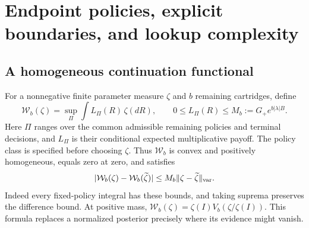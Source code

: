 \section{Endpoint policies, explicit boundaries, and lookup complexity}\label{sec:policy}
\subsection{A homogeneous continuation functional}
For a nonnegative finite parameter measure $\zeta$ and $b$ remaining
cartridges, define
\[
 \mathcal W_b(\zeta)=\sup_\Pi\int L_\Pi(R)\,\zeta(dR),
 \qquad 0\le L_\Pi(R)\le M_b:=G_+e^{b|\lambda|B}.
\]
Here $\Pi$ ranges over the common admissible remaining policies and terminal
decisions, and $L_\Pi$ is their conditional expected multiplicative payoff.
The policy class is specified before choosing $\zeta$. Thus $\mathcal W_b$
is convex and positively homogeneous, equals zero at zero, and satisfies
\begin{equation}
 |\mathcal W_b(\zeta)-\mathcal W_b(\widetilde\zeta)|
 \le M_b\|\zeta-\widetilde\zeta\|_{\rm var}. \label{eq:homogeneous-Lipschitz}
\end{equation}
Indeed every fixed-policy integral has these bounds, and taking suprema
preserves the difference bound. At positive mass,
$\mathcal W_b(\zeta)=\zeta(I)V_b(\zeta/\zeta(I))$. This formula replaces a
normalized posterior precisely where its evidence might vanish.

